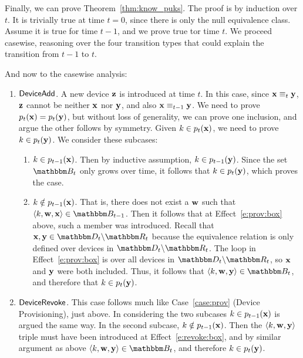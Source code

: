 Finally, we can prove Theorem~\ref{thm:know_puks}. The proof is by induction
over $t$. It is trivially true at time $t=0$, since there is only the null
equivalence class. Assume it is true for time $t-1$, and we prove true tor time
$t$. We proceed casewise, reasoning over the four transition types that could
explain the transition from $t-1$ to $t$.

And now to the casewise analysis:
\begin{enumerate}
  \item $\mathsf{DeviceAdd}{}$.
    \label{case:prov}
  A new device $\mathbf{z}$ is introduced at time $t$. In this case, since $\mathbf{x} \equiv_{t} \mathbf{y}$, 
  $\mathbf{z}$ cannot be neither $\mathbf{x}$ nor $\mathbf{y}$, and also $\mathbf{x} \equiv_{t-1} \mathbf{y}$.  
  We need to prove $p_{t}(\mathbf{x}) = p_{t}(\mathbf{y})$,
  but without loss of generality, we can prove one inclusion,
  and argue the other follows by symmetry. Given ${k} \in p_{t}(\mathbf{x})$,
  we need to prove ${k} \in p_{t}(\mathbf{y})$.  We consider these subcases:
  \begin{enumerate}
    \item ${k} \in p_{t-1}(\mathbf{x})$.
    Then by inductive assumption, ${k} \in  p_{t-1}(\mathbf{y})$.
    Since the set $\zset{b}_t$ only grows over time,
    it follows that ${k} \in p_{t}(\mathbf{y})$, which proves the case.
    \item ${k} \notin p_{t-1}(\mathbf{x})$.
    That is, there does not exist a $\mathbf{w}$
    such that $\langle \zkey{k}, \zdev{w}, \zdev{x} \rangle \in \zset{b}_{t-1}$.
    Then it follows that at Effect~\ref{e:prov:box} above, such a member was
    introduced. Recall that $\zdev{x}, \zdev{y} \in \zactive{t}$
    because the equivalence relation is only defined over devices in $\zactive{t}$.
    The loop in Effect~\ref{e:prov:box} is over all devices in $\zactive{t}$,
    so $\mathbf{x}$ and $\mathbf{y}$ were both included.
    Thus, it follows that $\langle \zkey{k}, \zdev{w}, \zdev{y} \rangle \in \zset{b}_t$,
    and therefore that ${k} \in p_{t}(\mathbf{y})$.
  \end{enumerate}

 \item $\mathsf{DeviceRevoke}{}$. This case follows much like Case~\ref{case:prov}
 (Device Provisioning), just above. In considering the two subcases
 ${k} \in p_{t-1}(\mathbf{x})$ is argued the same way.
 In the second subcase, 
 ${k} \notin p_{t-1}(\mathbf{x})$.
 Then the $\langle {k}, \mathbf{w}, \mathbf{y} \rangle$
 triple must have been introduced at Effect~\ref{e:revoke:box}, and by similar argument as above 
 $\langle \zkey{k}, \zdev{w}, \zdev{y} \rangle \in \zset{b}_t$,
 and therefore ${k} \in p_{t}(\mathbf{y})$.


\end{enumerate}
